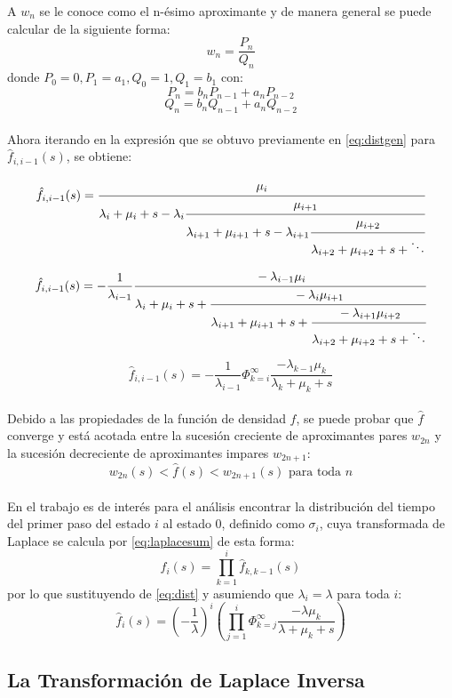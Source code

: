 \documentclass[11pt]{article}
\numberwithin{equation}{section} %
\begin{document}
A $w_n$ se le conoce como el n-ésimo aproximante y de manera general se puede calcular de la siguiente forma:
\[
w_n=\frac{P_n}{Q_n}
\]
donde $P_0=0, P_1=a_1,Q_0=1,Q_1=b_1$ con:
\[
P_n=b_n P_{n-1}+a_n P_{n-2}
\]
\[
Q_n=b_n Q_{n-1}+a_n Q_{n-2}
\]\\

Ahora iterando en la expresión que se obtuvo previamente en \ref{eq:distgen} para $\hat{f}_{i,i-1}(s)$, se obtiene:

\[
\hat{f}_{i,i-1}(s) = \cfrac{\mu_{i}}{\lambda_{i}+\mu_{i} + s - \lambda_{i}
\cfrac{\mu_{i+1}}{\lambda_{i+1}+\mu_{i+1} + s - \lambda_{i+1}
\cfrac{\mu_{i+2}}{\lambda_{i+2}+\mu_{i+2} + s + \ddots}}}
\]

\[
\hat{f}_{i,i-1}(s) = -\frac{1}{\lambda_{i-1}} \cfrac{-\lambda_{i-1}\mu_{i}}{\lambda_{i}+\mu_{i} + s +
\cfrac{-\lambda_{i}\mu_{i+1}}{\lambda_{i+1}+\mu_{i+1} + s +
\cfrac{-\lambda_{i+1}\mu_{i+2}}{\lambda_{i+2}+\mu_{i+2} + s + \ddots}}}
\]

\begin{equation} \label{eq:dist}
\hat{f}_{i,i-1}(s) = -\frac{1}{\lambda_{i-1}}\Phi_{k=i}^{\infty}\frac{-\lambda_{k-1}\mu_{k}}{\lambda_{k}+\mu_{k}+s}
\end{equation}\\

Debido a las propiedades de la función de densidad $f$, se puede probar \cite{abate1999} que $\hat{f}$ converge y está acotada entre la sucesión creciente de aproximantes pares $w_{2n}$ y la sucesión decreciente de aproximantes impares $w_{2n+1}$:
\[
w_{2n}(s)<\hat{f}(s)<w_{2n+1}(s) \text{ para toda }n 
\]
\\

En el trabajo es de interés para el análisis encontrar la distribución del tiempo del primer paso del estado $i$ al estado 0, definido como $\sigma_{i}$, cuya transformada de Laplace se calcula por \ref{eq:laplacesum} de esta forma:
\begin{equation}
\hat{f}_{i}(s)=\prod_{k=1}^{i}\hat{f}_{k,k-1}(s)
\end{equation}
por lo que sustituyendo de \ref{eq:dist} y asumiendo que $\lambda_i=\lambda$ para toda $i$:
\begin{equation} \label{eq:fidist}
\hat{f}_{i}(s)=\left(-\frac{1}{\lambda}\right)^i\left(\prod_{j=1}^{i}\Phi_{k=j}^{\infty}\frac{-\lambda\mu_{k}}{\lambda+\mu_{k}+s}\right)
\end{equation}


\subsection{La Transformación de Laplace Inversa}
\end{document}
